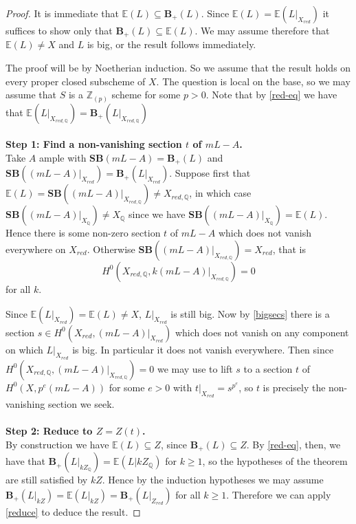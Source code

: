\documentclass[a4paper,12pt]{book}
\newcommand{\SB}{\mathbf{SB}}
\newcommand{\BS}{\mathbf{B}_{+}}
\begin{document}
\begin{proof}
	
	It is immediate that $\mathbb{E}(L)\subseteq \BS(L)$. Since $\mathbb{E}(L)=\mathbb{E}(L|_{X_{red}})$ it suffices to show only that $\BS(L) \subseteq \mathbb{E}(L)$. We may assume therefore that $\mathbb{E}(L) \neq X$ and $L$  is big, or the result follows immediately.
	
	The proof will be by Noetherian induction. So we assume that the result holds on every proper closed subscheme of $X$. The question is local on the base, so we may assume that $S$ is a $\mathbb{Z}_{(p)}$ scheme for some $p > 0$. Note that by \autoref{red-eq} we have that $\mathbb{E}(L|_{X_{red,\mathbb{Q}}})=\BS(L|_{X_{red,\mathbb{Q}}})$\\
	\\
	\textbf{Step 1: Find a non-vanishing section $t$ of $mL-A$.}\\
	
	Take $A$ ample with $\SB(mL-A)=\BS(L)$ and $\SB((mL-A)|_{X_{red}})=\BS(L|_{X_{red}})$. Suppose first that $\mathbb{E}(L)=\SB((mL-A)|_{X_{red,\mathbb{Q}}}) \neq X_{red,\mathbb{Q}}$, in which case $\SB((mL-A)|_{X_{\mathbb{Q}}}) \neq X_{\mathbb{Q}}$ since we have $\SB((mL-A)|_{X_{\mathbb{Q}}})=\mathbb{E}(L)$. Hence there is some non-zero section $t$ of $mL-A$ which does not vanish everywhere on $X_{red}$. Otherwise $\SB((mL-A)|_{X_{red,\mathbb{Q}}}) = X_{red}$, that is $$H^{0}(X_{red,\mathbb{Q}},k(mL-A)|_{X_{red,\mathbb{Q}}}) =0$$ for all $k$. 
	
	Since $\mathbb{E}(L|_{X_{red}})=\mathbb{E}(L) \neq X$, $L|_{X_{red}}$ is still big. Now by \autoref{bigsecs} there is a section $s\in H^{0}(X_{red},(mL-A)|_{X_{red}})$ which does not vanish on any component on which $L|_{X_{red}}$ is big. In particular it does not vanish everywhere. Then since $H^{0}(X_{red,\mathbb{Q}},(mL-A)|_{X_{red,\mathbb{Q}}}) =0$ we may use \cite[Proposition 3.5]{witaszek2020keels} to lift $s$ to a section $t$ of $H^{0}(X,p^{e}(mL-A))$ for some $e > 0$ with $t|_{X_{red}}=s^{p^{e}}$, so $t$ is precisely the non-vanishing section we seek.\\
	\\
	\textbf{Step 2: Reduce to $Z=Z(t)$.}\\
	
	By construction we have $\mathbb{E}(L)\subseteq Z$, since $\BS(L) \subseteq Z$. By \autoref{red-eq}, then, we have that $\BS(L|_{kZ_{\mathbb{Q}}})=\mathbb{E}(L|{kZ_{\mathbb{Q}}})$ for $k \geq 1$, so the hypotheses of the theorem are still satisfied by $kZ$. Hence by the induction hypotheses we may assume $\BS(L|_{kZ})=\mathbb{E}(L|_{kZ})=\BS(L|_{Z_{red}})$ for all $k \geq 1$. Therefore we can apply \autoref{reduce} to deduce the result.
\end{proof}
\end{document}
